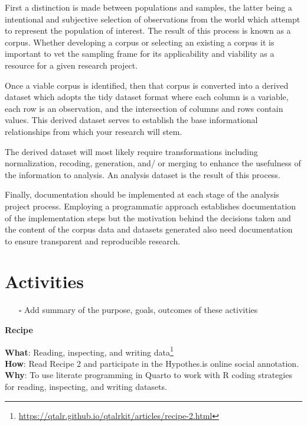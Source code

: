 \documentclass[
  letterpaper,
]{latex/krantz}
\providecommand{\tightlist}{%
  \setlength{\itemsep}{0pt}\setlength{\parskip}{0pt}}\usepackage{longtable,booktabs,array}
\DeclareRobustCommand{\href}[2]{#2\footnote{\url{#1}}}
\begin{document}
First a distinction is made between populations and samples, the latter
being a intentional and subjective selection of observations from the
world which attempt to represent the population of interest. The result
of this process is known as a corpus. Whether developing a corpus or
selecting an existing a corpus it is important to vet the sampling frame
for its applicability and viability as a resource for a given research
project.

Once a viable corpus is identified, then that corpus is converted into a
derived dataset which adopts the tidy dataset format where each column
is a variable, each row is an observation, and the intersection of
columns and rows contain values. This derived dataset serves to
establish the base informational relationships from which your research
will stem.

The derived dataset will most likely require transformations including
normalization, recoding, generation, and/ or merging to enhance the
usefulness of the information to analysis. An analysis dataset is the
result of this process.

Finally, documentation should be implemented at each stage of the
analysis project process. Employing a programmatic approach establishes
documentation of the implementation steps but the motivation behind the
decisions taken and the content of the corpus data and datasets
generated also need documentation to ensure transparent and reproducible
research.

\hypertarget{activities-1}{%
\section*{Activities}\label{activities-1}}


\begin{itemize}
\tightlist
\item[$\square$]
  Add summary of the purpose, goals, outcomes of these activities
\end{itemize}

\begin{tcolorbox}[enhanced jigsaw, arc=.35mm, leftrule=.75mm, rightrule=.15mm, opacityback=0, colback=white, breakable, bottomrule=.15mm, left=2mm, toprule=.15mm]

\textbf{ Recipe}

\textbf{What}:
\href{https://qtalr.github.io/qtalrkit/articles/recipe-2.html}{Reading,
inspecting, and writing data}\\
\textbf{How}: Read Recipe 2 and participate in the Hypothes.is online
social annotation.\\
\textbf{Why}: To use literate programming in Quarto to work with R
coding strategies for reading, inspecting, and writing datasets.

\end{tcolorbox}
\end{document}

